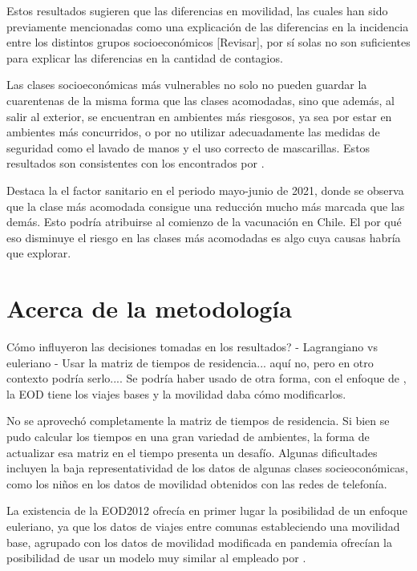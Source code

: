 Estos resultados sugieren que las diferencias en movilidad, las cuales han sido previamente mencionadas como una explicación de las diferencias en la incidencia entre los distintos grupos socioeconómicos \cite{Mena2021}\cite{Gozzi2021} [Revisar], por sí solas no son suficientes para explicar las diferencias en la cantidad de contagios.

Las clases socioeconómicas más vulnerables no solo no pueden guardar la cuarentenas de la misma forma que las clases acomodadas, sino que además, al salir al exterior, se encuentran en ambientes más riesgosos, ya sea por estar en ambientes más concurridos, o por no utilizar adecuadamente las medidas de seguridad como el lavado de manos y el uso correcto de mascarillas. Estos resultados son consistentes con los encontrados por \cite{Chang2021}.

Destaca la el factor sanitario en el periodo mayo-junio de 2021, donde se observa que la clase más acomodada consigue una reducción mucho más marcada que las demás. Esto podría atribuirse al comienzo de la vacunación en Chile. El por qué eso disminuye el riesgo en las clases más acomodadas es algo cuya causas habría que explorar.




\section{Acerca de la metodología}

  

Cómo influyeron las decisiones tomadas en los resultados? 
- Lagrangiano vs euleriano 
- Usar la matriz de tiempos de residencia... aquí no, pero en otro contexto podría serlo.... Se podría haber usado de otra forma, con el enfoque de \cite{Chang2021}, la EOD tiene los viajes bases y la movilidad daba cómo modificarlos.

No se aprovechó completamente la matriz de tiempos de residencia. Si bien se pudo calcular los tiempos en una gran variedad de ambientes, la forma de actualizar esa matriz en el tiempo presenta un desafío. Algunas dificultades incluyen la baja representatividad de los datos de algunas clases socieoconómicas, como los niños en los datos de movilidad obtenidos con las redes de telefonía. 

La existencia de la EOD2012 ofrecía en primer lugar la posibilidad de un enfoque euleriano, ya que los datos de viajes entre comunas estableciendo una movilidad base, agrupado con los datos de movilidad modificada en pandemia ofrecían la posibilidad de usar un modelo muy similar al empleado por \cite{Lai2020}.


